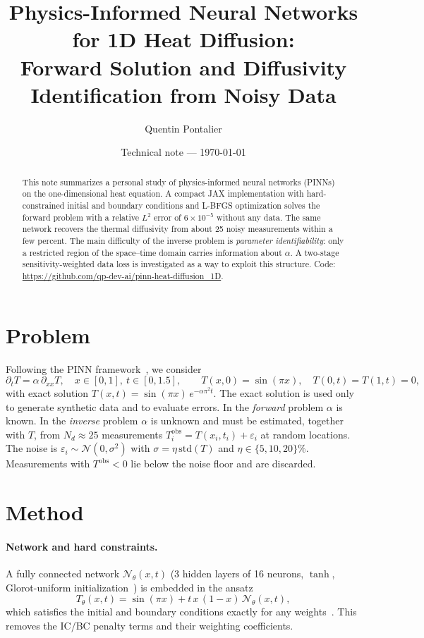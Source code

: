 \documentclass[10pt]{article}
\title{\textbf{Physics-Informed Neural Networks for 1D Heat Diffusion:\\Forward Solution and Diffusivity Identification from Noisy Data}}
\author{Quentin Pontalier}
\date{Technical note --- \today}
\begin{document}
\maketitle

\begin{abstract}
\noindent This note summarizes a personal study of physics-informed neural networks (PINNs) on the one-dimensional heat equation. A compact JAX implementation with hard-constrained initial and boundary conditions and L-BFGS optimization solves the forward problem with a relative $L^2$ error of $6\times10^{-5}$ without any data. The same network recovers the thermal diffusivity from about 25 noisy measurements within a few percent. The main difficulty of the inverse problem is \emph{parameter identifiability}: only a restricted region of the space--time domain carries information about $\alpha$. A two-stage sensitivity-weighted data loss is investigated as a way to exploit this structure. Code: \url{https://github.com/qp-dev-ai/pinn-heat-diffusion_1D}.
\end{abstract}

\section{Problem}
Following the PINN framework~\cite{raissi2019}, we consider
\begin{equation}
\partial_t T = \alpha\, \partial_{xx} T, \quad x\in[0,1],\ t\in[0,1.5], \qquad T(x,0)=\sin(\pi x),\quad T(0,t)=T(1,t)=0,
\end{equation}
with exact solution $T(x,t)=\sin(\pi x)\,e^{-\alpha\pi^2 t}$. The exact solution is used only to generate synthetic data and to evaluate errors. In the \emph{forward} problem $\alpha$ is known. In the \emph{inverse} problem $\alpha$ is unknown and must be estimated, together with $T$, from $N_d\approx 25$ measurements $T_i^{\mathrm{obs}} = T(x_i,t_i)+\varepsilon_i$ at random locations. The noise is $\varepsilon_i\sim\mathcal{N}(0,\sigma^2)$ with $\sigma = \eta\,\mathrm{std}(T)$ and $\eta\in\{5,10,20\}\%$. Measurements with $T^{\mathrm{obs}}<0$ lie below the noise floor and are discarded.

\section{Method}
\paragraph{Network and hard constraints.} A fully connected network $\mathcal{N}_\theta(x,t)$ (3 hidden layers of 16 neurons, $\tanh$, Glorot-uniform initialization~\cite{glorot2010}) is embedded in the ansatz
\begin{equation}
T_\theta(x,t) = \sin(\pi x) + t\,x\,(1-x)\,\mathcal{N}_\theta(x,t),
\end{equation}
which satisfies the initial and boundary conditions exactly for any weights~\cite{lagaris1998}. This removes the IC/BC penalty terms and their weighting coefficients.
\end{document}
